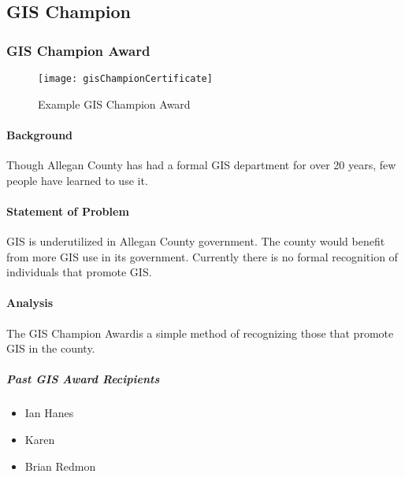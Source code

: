 %
%
%
%
\def\titlename{GIS Champion Award}
\def\authorName{Allegan County GIS Services}
\def\pdfTitle{The GIS Award}
\def\pdfSubject{GIS Tools} %
\def\pdfKeywords{mobile,gis}


\subsection{GIS Champion}
\subsubsection{GIS Champion Award}
 \begin{figure}[h!]
\centering
    \texttt{[image: gisChampionCertificate]}
\vspace{-.2in}

\caption{Example GIS Champion Award}
\end{figure}

\begin{adjmulticols}{2}{\innerMar}{\outerMar}
\paragraph{Background}
\noindent Though Allegan County has had a formal GIS department for over 20 years, few people have learned to use it.
\paragraph{Statement of Problem}
\noindent GIS is underutilized in Allegan County government.  The county would benefit from more GIS use in its government.  Currently there is no formal recognition of individuals that promote GIS.
\paragraph{Analysis}
\noindent The GIS Champion Awardis a simple method of recognizing those that promote GIS in the county.
\subparagraph*{Past GIS Award Recipients}
\begin{itemize}
\item Ian Hanes
\item Karen
\item Brian Redmon
\end{itemize}
\end{adjmulticols}
\clearpage
